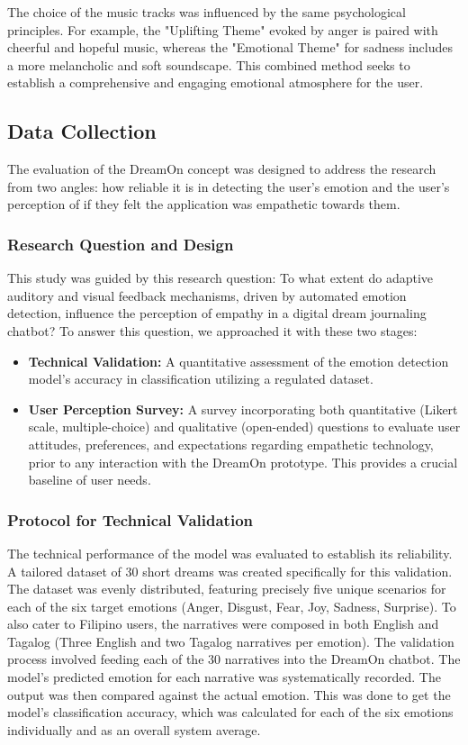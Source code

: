 \documentclass[conference]{IEEEtran}
\begin{document}
	The choice of the music tracks was influenced by the same psychological principles. For example, the "Uplifting Theme" evoked by anger is paired with cheerful and hopeful music, whereas the "Emotional Theme" for sadness includes a more melancholic and soft soundscape. This combined method seeks to establish a comprehensive and engaging emotional atmosphere for the user.
	
	
	\subsection{Data Collection}
	The evaluation of the DreamOn concept was designed to address the research from two angles: how reliable it is in detecting the user’s emotion and the user’s perception of if they felt the application was empathetic towards them.
	
	\subsubsection{Research Question and Design}
	This study was guided by this research question: To what extent do adaptive auditory and visual feedback mechanisms, driven by automated emotion detection, influence the perception of empathy in a digital dream journaling chatbot? To answer this question, we approached it with these two stages:
	\begin{itemize}
		\item \textbf{Technical Validation:} A quantitative assessment of the emotion detection model's accuracy in classification utilizing a regulated dataset.
		\item \textbf{User Perception Survey:} A survey incorporating both quantitative (Likert scale, multiple-choice) and qualitative (open-ended) questions to evaluate user attitudes, preferences, and expectations regarding empathetic technology, prior to any interaction with the DreamOn prototype. This provides a crucial baseline of user needs.
	\end{itemize}
	
	\subsubsection{Protocol for Technical Validation}
	The technical performance of the model was evaluated to establish its reliability. A tailored dataset of 30 short dreams was created specifically for this validation. The dataset was evenly distributed, featuring precisely five unique scenarios for each of the six target emotions (Anger, Disgust, Fear, Joy, Sadness, Surprise). To also cater to Filipino users, the narratives were composed in both English and Tagalog (Three English and two Tagalog narratives per emotion).
	The validation process involved feeding each of the 30 narratives into the DreamOn chatbot. The model's predicted emotion for each narrative was systematically recorded. The output was then compared against the actual emotion. This was done to get the model’s classification accuracy, which was calculated for each of the six emotions individually and as an overall system average.
	
\end{document}
